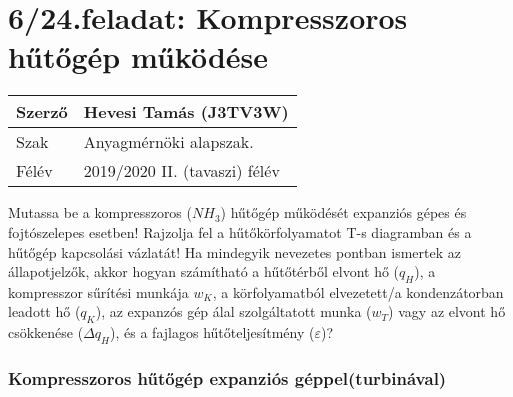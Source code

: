 \section*{6/24.feladat: Kompresszoros hűtőgép működése}


\begin{tabular}{ | p{2cm} | p{14cm} | } 
	\hline
	Szerző & Hevesi Tamás (J3TV3W) \\ 
	\hline
	Szak & Anyagmérnöki alapszak. \\ 
	\hline
	Félév & 2019/2020 II. (tavaszi) félév \\ 
	\hline
\end{tabular}
\vspace{0.5cm}

\noindent Mutassa be a kompresszoros ($NH_3$) hűtőgép működését expanziós gépes és fojtószelepes esetben! Rajzolja fel a hűtőkörfolyamatot T-s diagramban és a hűtőgép kapcsolási vázlatát! Ha mindegyik nevezetes pontban ismertek az állapotjelzők, akkor hogyan számítható a hűtőtérből elvont hő ($q_H$), a kompresszor sűrítési munkája $w_K$, a körfolyamatból elvezetett/a kondenzátorban leadott hő ($q_K$), az expanzós gép álal szolgáltatott munka ($w_T$) vagy az elvont hő csökkenése ($Δq_H$), és a fajlagos hűtőteljesítmény ($\varepsilon$)?

\subsubsection{Kompresszoros hűtőgép expanziós géppel(turbinával)}

